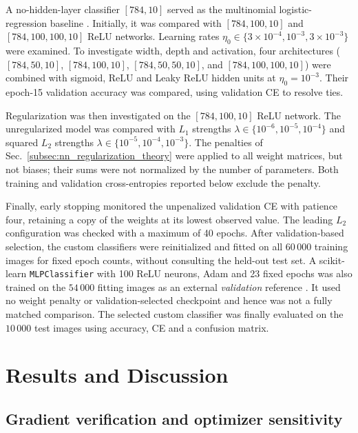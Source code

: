 \documentclass[aps,rmp,reprint,amsmath,amssymb,graphicx,longbibliography]{revtex4-1}
\begin{document}
A no-hidden-layer classifier $[784,10]$ served as the multinomial
logistic-regression baseline \cite{Book_Ch5}. Initially, it was compared
with $[784,100,10]$ and $[784,100,100,10]$ ReLU networks. Learning rates
$\eta_0\in\{3\times10^{-4},10^{-3},3\times10^{-3}\}$ were examined.
To investigate width, depth and activation, four architectures
($[784,50,10]$, $[784,100,10]$, $[784,50,50,10]$, and
$[784,100,100,10]$) were combined with sigmoid, ReLU and Leaky ReLU
hidden units at $\eta_0=10^{-3}$. Their epoch-15 validation accuracy
was compared, using validation CE to resolve ties.

Regularization was then investigated on the $[784,100,10]$ ReLU
network. The unregularized model was compared with
$L_1$ strengths $\lambda\in\{10^{-6},10^{-5},10^{-4}\}$ and
squared $L_2$ strengths $\lambda\in\{10^{-5},10^{-4},10^{-3}\}$.
The penalties of Sec.~\ref{subsec:nn_regularization_theory} were
applied to all weight matrices, but not biases; their sums were not
normalized by the number of parameters. Both training and validation
cross-entropies reported below exclude the penalty.

Finally, early stopping monitored the unpenalized validation
CE with patience four, retaining a copy of the weights at
its lowest observed value. The leading $L_2$ configuration was checked
with a maximum of 40 epochs. After validation-based selection, the
custom classifiers were reinitialized and fitted on all $60\,000$
training images for fixed epoch counts, without consulting the held-out
test set. A scikit-learn \texttt{MLPClassifier} with 100 ReLU neurons,
Adam and 23 fixed epochs was also trained on the $54\,000$ fitting
images as an external \emph{validation} reference \cite{Pedregosa2011}.
It used no weight penalty or validation-selected checkpoint and hence
was not a fully matched comparison. The selected custom classifier was
finally evaluated on the $10\,000$ test images using accuracy,
CE and a confusion matrix.


\section{Results and Discussion}


\subsection{Gradient verification and optimizer sensitivity}
\label{subsec:partb_results_optim}
\end{document}
